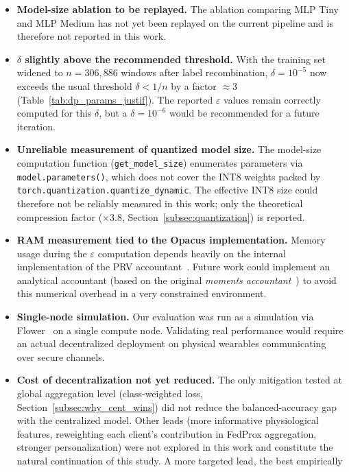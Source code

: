 \documentclass{article}
\begin{document}
\begin{itemize}
  \item \textbf{Model-size ablation to be replayed.} The ablation comparing MLP
  Tiny and MLP Medium has not yet been replayed on the current pipeline and is
  therefore not reported in this work.
  \item \textbf{$\delta$ slightly above the recommended threshold.} With the
  training set widened to $n = 306{,}886$ windows after label recombination,
  $\delta = 10^{-5}$ now exceeds the usual threshold $\delta < 1/n$ by a factor
  $\approx 3$ (Table~\ref{tab:dp_params_justif}). The reported $\varepsilon$
  values remain correctly computed for this $\delta$, but a $\delta = 10^{-6}$
  would be recommended for a future iteration.
  \item \textbf{Unreliable measurement of quantized model size.} The model-size
  computation function (\texttt{get\_model\_size}) enumerates parameters via
  \texttt{model.parameters()}, which does not cover the INT8 weights packed by
  \texttt{torch.quantization.quantize\_dynamic}. The effective INT8 size could
  therefore not be reliably measured in this work; only the theoretical
  compression factor ($\times 3.8$, Section~\ref{subsec:quantization}) is
  reported.
  \item \textbf{RAM measurement tied to the Opacus implementation.} Memory usage
  during the $\varepsilon$ computation depends heavily on the internal
  implementation of the PRV accountant~\cite{opacus}. Future work could
  implement an analytical accountant (based on the original \textit{moments
  accountant}~\cite{abadi2016deep}) to avoid this numerical overhead in a very
  constrained environment.
  \item \textbf{Single-node simulation.} Our evaluation was run as a simulation
  via Flower~\cite{beutel2020flower} on a single compute node. Validating real
  performance would require an actual decentralized deployment on physical
  wearables communicating over secure channels.
  \item \textbf{Cost of decentralization not yet reduced.} The only mitigation
  tested at global aggregation level (class-weighted loss,
  Section~\ref{subsec:why_cent_wins}) did not reduce the balanced-accuracy gap
  with the centralized model. Other leads (more informative physiological
  features, reweighting each client's contribution in FedProx aggregation,
  stronger personalization) were not explored in this work and constitute the
  natural continuation of this study. A more targeted lead, the best empirically

\end{itemize}
\end{document}
